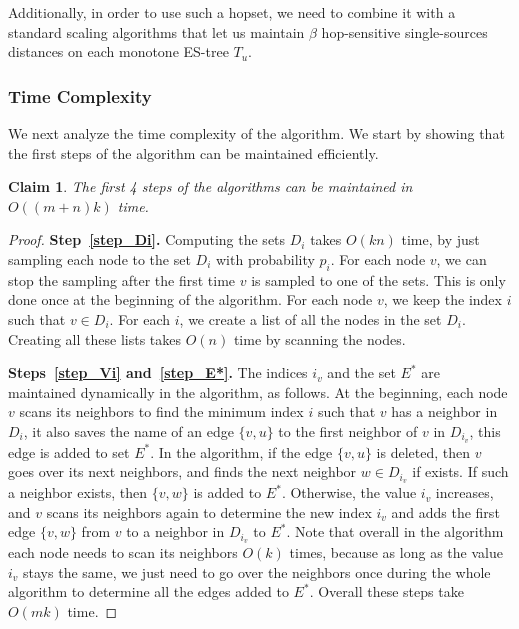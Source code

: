 \documentclass[11pt]{article}
\newtheorem{claim}[theorem]{Claim}
\theoremstyle{definition}
\theoremstyle{remark}
\begin{document}
\begin{titlepage}
Additionally, in order to use such a hopset, we need to combine it with a standard scaling algorithms that let us maintain $\beta$ hop-sensitive single-sources distances on each monotone ES-tree $T_u$. 
\fi

\subsubsection{Time Complexity} \label{sec:add_complexity}

We next analyze the time complexity of the algorithm. We start by showing that the first steps of the algorithm can be maintained efficiently. 

\begin{claim}
The first 4 steps of the algorithms can be maintained in $O((m+n)k)$ time.
\end{claim}

\begin{proof}
\textbf{Step~\ref{step_Di}.} Computing the sets $D_i$ takes $O(kn)$ time, by just sampling each node to the set $D_i$ with probability $p_i$. For each node $v$, we can stop the sampling after the first time $v$ is sampled to one of the sets. This is only done once at the beginning of the algorithm. For each node $v$, we keep the index $i$ such that $v \in D_i$. For each $i$, we create a list of all the nodes in the set $D_i$. Creating all these lists takes $O(n)$ time by scanning the nodes.

\textbf{Steps~\ref{step_Vi} and~\ref{step_E*}.} The indices $i_v$ and the set $E^*$ are maintained dynamically in the algorithm, as follows. At the beginning, each node $v$ scans its neighbors to find the minimum index $i$ such that $v$ has a neighbor in $D_i$, it also saves the name of an edge $\{v,u\}$ to the first neighbor of $v$ in $D_{i_v}$, this edge is added to set $E^*$. In the algorithm, if the edge $\{v,u\}$ is deleted, then $v$ goes over its next neighbors, and finds the next neighbor $w \in D_{i_v}$ if exists. If such a neighbor exists, then $\{v,w\}$ is added to $E^*$. Otherwise, the value $i_v$ increases, and $v$ scans its neighbors again to determine the new index $i_v$ and adds the first edge $\{v,w\}$ from $v$ to a neighbor in $D_{i_v}$ to $E^*$. Note that overall in the algorithm each node needs to scan its neighbors $O(k)$ times, because as long as the value $i_v$ stays the same, we just need to go over the neighbors once during the whole algorithm to determine all the edges added to $E^*$. Overall these steps take $O(mk)$ time. 


\end{proof}
\end{titlepage}
\end{document}
